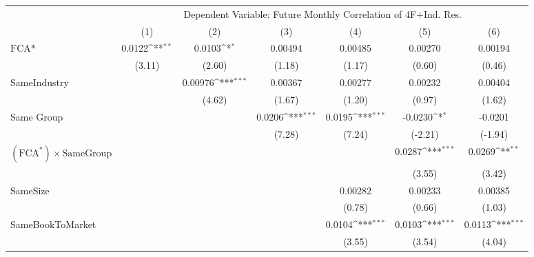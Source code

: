 {
\def\sym#1{\ifmmode^{#1}\else\(^{#1}\)\fi}
\begin{tabular}{l*{6}{c}}
\hline\hline
                &\multicolumn{6}{c}{Dependent Variable: Future Monthly Correlation of 4F+Ind. Res.}                               \\\cmidrule(lr){2-7}
                &\multicolumn{1}{c}{(1)}         &\multicolumn{1}{c}{(2)}         &\multicolumn{1}{c}{(3)}         &\multicolumn{1}{c}{(4)}         &\multicolumn{1}{c}{(5)}         &\multicolumn{1}{c}{(6)}         \\
\hline
$ \text{FCA*} $ &   0.0122\sym{**} &   0.0103\sym{*}  &  0.00494         &  0.00485         &  0.00270         &  0.00194         \\
                &   (3.11)         &   (2.60)         &   (1.18)         &   (1.17)         &   (0.60)         &   (0.46)         \\
[1em]
SameIndustry    &                  &  0.00976\sym{***}&  0.00367         &  0.00277         &  0.00232         &  0.00404         \\
                &                  &   (4.62)         &   (1.67)         &   (1.20)         &   (0.97)         &   (1.62)         \\
[1em]
Same Group      &                  &                  &   0.0206\sym{***}&   0.0195\sym{***}&  -0.0230\sym{*}  &  -0.0201         \\
                &                  &                  &   (7.28)         &   (7.24)         &  (-2.21)         &  (-1.94)         \\
[1em]
 $ (\text{FCA}^*) \times {\text{SameGroup} }  $ &                  &                  &                  &                  &   0.0287\sym{***}&   0.0269\sym{**} \\
                &                  &                  &                  &                  &   (3.55)         &   (3.42)         \\
[1em]
SameSize        &                  &                  &                  &  0.00282         &  0.00233         &  0.00385         \\
                &                  &                  &                  &   (0.78)         &   (0.66)         &   (1.03)         \\
[1em]
SameBookToMarket&                  &                  &                  &   0.0104\sym{***}&   0.0103\sym{***}&   0.0113\sym{***}\\
                &                  &                  &                  &   (3.55)         &   (3.54)         &   (4.04)         \\

\end{tabular}}
